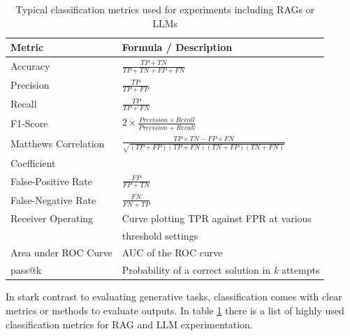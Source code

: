 {\renewcommand{\arraystretch}{1.5}%
\begin{table}
  \centering
 \begin{tabular}{|l|l|}
  \hline
  \textbf{Metric} & \textbf{Formula / Description} \\[3pt]
  \hline Accuracy & $\frac{TP + TN}{TP + TN + FP + FN}$\\[5pt]
  \hline Precision & $\frac{TP}{TP + FP}$\\[5pt]
  \hline Recall & $\frac{TP}{TP + FN}$\\[2pt]
  \hline F1-Score & $2 \times \frac{Precision \times Recall}{Precision + Recall}$\\[2pt]
  \hline Matthews Correlation & $\frac{TP \times TN - FP \times FN}{\sqrt{(TP + FP)(TP + FN)(TN + FP)(TN + FN)}}$\\Coefficient & \\[2pt]
  \hline False-Positive Rate & $\frac{FP}{FP + TN}$\\[2pt]
  \hline False-Negative Rate & $\frac{FN}{FN + TP}$\\[2pt]
  \hline Receiver Operating & Curve plotting TPR against FPR at various \\&threshold settings\\[2pt]
  \hline Area under ROC Curve &  AUC of the ROC curve\\[2pt]
  \hline pass@k & Probability of a correct solution in \textit{k} attempts \\[2pt]
  \hline
 \end{tabular}
 \caption{Typical classification metrics used for experiments including RAGs or LLMs\cite{Hou.8212023,Zeng.28.03.2024}}
 \label{table:classification_metrics}
\end{table}}

In stark contrast to evaluating generative tasks, classification comes with clear metrics or methods to evaluate outputs. In table \ref{table:classification_metrics} there is a list of highly used classification metrics for RAG and LLM experimentation.\cite{Hou.8212023,Zeng.28.03.2024} 

